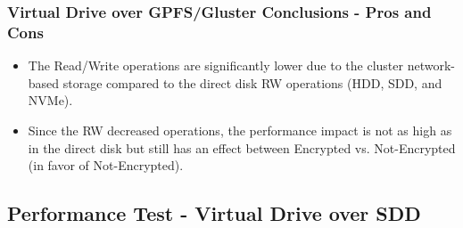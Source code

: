 \subsubsection{Virtual Drive over GPFS/Gluster Conclusions - Pros and Cons}
\begin{itemize}
  \item The Read/Write operations are significantly lower due to the cluster network-based storage compared to the direct disk RW operations (HDD, SDD, and NVMe).
  \item Since the RW decreased operations, the performance impact is not as high as in the direct disk but still has an effect between Encrypted vs. Not-Encrypted (in favor of Not-Encrypted).
\end{itemize}

\newpage
\subsection{Performance Test - Virtual Drive over SDD}
